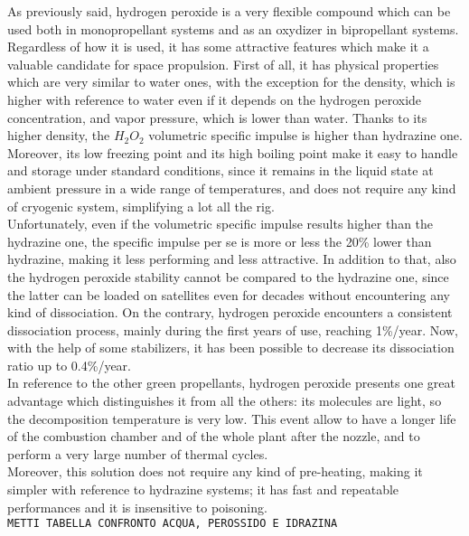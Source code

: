 \documentclass[a4paper]{report}
\begin{document}
As previously said, hydrogen peroxide is a very flexible compound which can be used both in monopropellant systems and as an oxydizer in bipropellant systems. Regardless of how it is used, it has some attractive features which make it a valuable candidate for space propulsion. First of all, it has physical properties which are very similar to water ones, with the exception for the density, which is higher with reference to water even if it depends on the hydrogen peroxide concentration, and vapor pressure, which is lower than water. Thanks to its higher density, the $H_2O_2$ volumetric specific impulse is higher than hydrazine one. Moreover, its low freezing point and its high boiling point make it easy to handle and storage under standard conditions, since it remains in the liquid state at ambient pressure in a wide range of temperatures, and does not require any kind of cryogenic system, simplifying a lot all the rig. \\  %
Unfortunately, even if the volumetric specific impulse results higher than the hydrazine one, the specific impulse per se is more or less the 20\% lower than hydrazine, making it less performing and less attractive. In addition to that, also the hydrogen peroxide stability cannot be compared to the hydrazine one, since the latter can be loaded on satellites even for decades without encountering any kind of dissociation. On the contrary, hydrogen peroxide encounters a consistent dissociation process, mainly during the first years of use, reaching 1\%/year. Now, with the help of some stabilizers, it has been possible to decrease its dissociation ratio up to 0.4\%/year.\\ 
In reference to the other green propellants, hydrogen peroxide presents one great advantage which distinguishes it from all the others: its molecules are light, so the decomposition temperature is very low. This event allow to have a longer life of the combustion chamber and of the whole plant after the nozzle, and to perform a very large number of thermal cycles. \\
Moreover, this solution does not require any kind of pre-heating, making it simpler with reference to hydrazine systems; it has fast and repeatable performances and it is insensitive to poisoning. \\ 

\texttt{\color{red}METTI TABELLA CONFRONTO ACQUA, PEROSSIDO E IDRAZINA}
\end{document}
